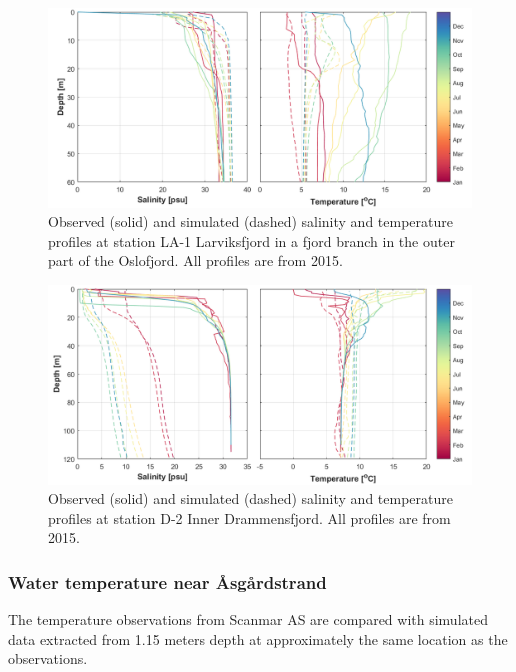 \begin{figure}[tbh]
\centerline{
\includegraphics*[trim=0cm 0cm 0cm 0cm,clip=true,width=\textwidth]{Figurer/CTD_LA-1}}
\caption{\small
Observed (solid) and simulated (dashed) salinity and temperature profiles at station LA-1 Larviksfjord in a fjord branch in the outer part of the Oslofjord. All profiles are from 2015.}
\label{fig:CTD_LA-1}
\end{figure}

\begin{figure}[tbh]
\centerline{
\includegraphics*[trim=0cm 0cm 0cm 0cm,clip=true,width=\textwidth]{Figurer/CTD_D-2}}
\caption{\small
Observed (solid) and simulated (dashed) salinity and temperature profiles at station D-2 Inner Drammensfjord. All profiles are from 2015.}
\label{fig:CTD_D-2}
\end{figure}

\clearpage 

\subsubsection{Water temperature near \AA sg\aa rdstrand}

The temperature observations from Scanmar AS are compared with simulated data extracted from 1.15 meters depth at approximately the same location as the observations.

